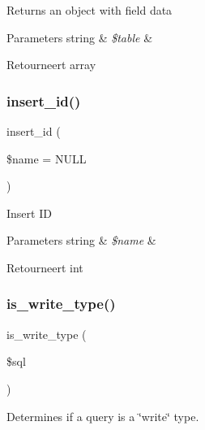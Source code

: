 Returns an object with field data


\begin{DoxyParams}[1]{Parameters}
string & {\em \$table} & \\
\hline
\end{DoxyParams}
\begin{DoxyReturn}{Retourneert}
array 
\end{DoxyReturn}
\mbox{\label{class_c_i___d_b__pdo__pgsql__driver_ae61dc2c85e5516f143f6246c686bc3fc}} 
\subsubsection{\texorpdfstring{insert\_id()}{insert\_id()}}
{\footnotesize\ttfamily insert\+\_\+id (\begin{DoxyParamCaption}\item[{}]{\$name = {\ttfamily NULL} }\end{DoxyParamCaption})}

Insert ID


\begin{DoxyParams}[1]{Parameters}
string & {\em \$name} & \\
\hline
\end{DoxyParams}
\begin{DoxyReturn}{Retourneert}
int 
\end{DoxyReturn}
\mbox{\label{class_c_i___d_b__pdo__pgsql__driver_af435df5703c238769d6d16fde6d51182}} 
\subsubsection{\texorpdfstring{is\_write\_type()}{is\_write\_type()}}
{\footnotesize\ttfamily is\+\_\+write\+\_\+type (\begin{DoxyParamCaption}\item[{}]{\$sql }\end{DoxyParamCaption})}

Determines if a query is a \char`\"{}write\char`\"{} type.


